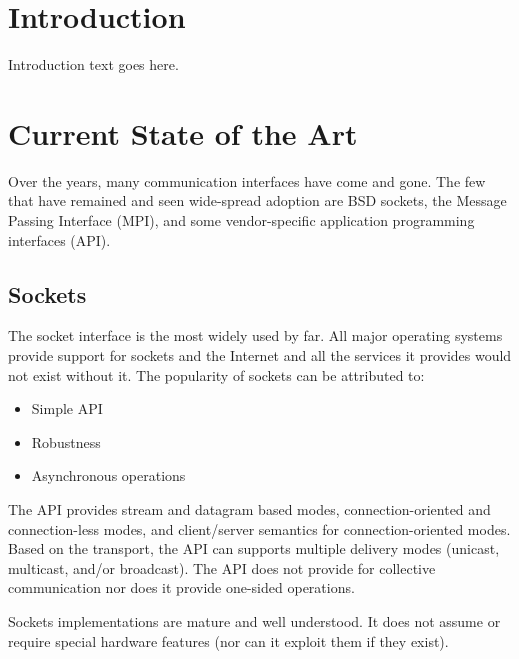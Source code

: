 \documentclass[conference]{IEEEtran}
\begin{document}

\IEEEpeerreviewmaketitle

\newcommand{\note}[1]{\colorbox{yellow!50}{Note: #1}}

\newcommand{\f}[1]{\texttt{#1{\kern-2pt}()}}

\section{Introduction}
Introduction text goes here.

\section{Current State of the Art}
Over the years, many communication interfaces have come and gone. The few that have
remained and seen wide-spread adoption are BSD sockets\cite{bsd}, the Message Passing
Interface (MPI)\cite{mpi}, and some vendor-specific application programming interfaces
(API).

\subsection{Sockets} The socket interface is the most widely used by far. All major
operating systems provide support for sockets and the Internet and all the services it
provides would not exist without it. The popularity of sockets can be attributed to:

\begin{itemize}
\item Simple API
\item Robustness
\item Asynchronous operations
\end{itemize}

The API provides stream and datagram based modes, connection-oriented and connection-less
modes, and client/server semantics for connection-oriented modes. Based on the transport,
the API can supports multiple delivery modes (unicast, multicast, and/or broadcast). The
API does not provide for collective communication nor does it provide one-sided
operations.

Sockets implementations are mature and well understood. It does not assume or require
special hardware features (nor can it exploit them if they exist).
\end{document}
